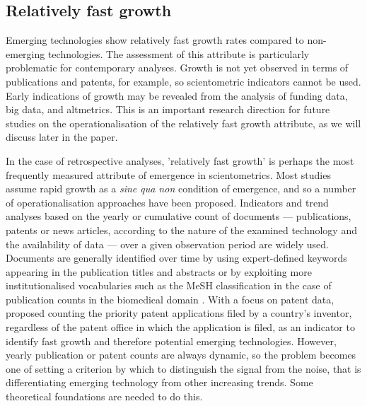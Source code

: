 \documentclass[11pt]{article}
\begin{document}
\subsection{Relatively fast growth}
Emerging technologies show relatively fast growth rates compared to non-emerging technologies. The assessment of this attribute is particularly problematic for contemporary analyses. Growth is not yet observed in terms of publications and patents, for example, so scientometric indicators cannot be used. Early indications of growth may be revealed from the analysis of funding data, big data, and altmetrics. This is an important research direction for future studies on the operationalisation of the relatively fast growth attribute, as we will discuss later in the paper.

 In the case of retrospective analyses, 'relatively fast growth' is perhaps the most frequently measured attribute of emergence in scientometrics. Most studies assume rapid growth as a \textit{sine qua non} condition of emergence, and so a number of operationalisation approaches have been proposed. Indicators and trend analyses based on the yearly or cumulative count of documents --- publications, patents or news articles, according to the nature of the examined technology and the availability of data --- over a given observation period are widely used. Documents are generally identified over time by using expert-defined keywords appearing in the publication titles and abstracts \citep[e.g.][]{Porter1995} or by exploiting more institutionalised vocabularies such as the MeSH classification in the case of publication counts in the biomedical domain \citep[e.g.][]{Guo2011}. With a focus on patent data, \cite{DeRassenfosse2013} proposed counting the priority patent applications filed by a country's inventor, regardless of the patent office in which the application is filed, as an indicator to identify fast growth and therefore potential emerging technologies. However, yearly publication or patent counts are always dynamic, so the problem becomes one of setting a criterion by which to distinguish the signal from the noise, that is differentiating emerging technology from other increasing trends. Some theoretical foundations are needed to do this. 
\end{document}
